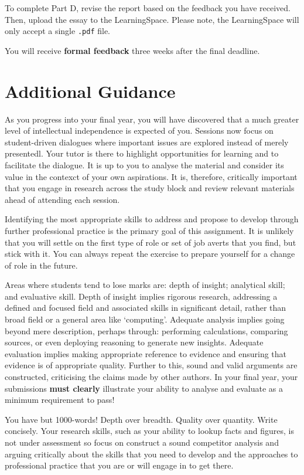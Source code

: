 \documentclass{../../fal_assignment}
\begin{document}
To complete Part D, revise the report based on the feedback you have received. Then, upload the essay to the LearningSpace. Please note, the LearningSpace will only accept a single \texttt{.pdf} file.

You will receive \textbf{formal feedback} three weeks after the final deadline.

\section*{Additional Guidance}

As you progress into your final year, you will have discovered that a much greater level of intellectual independence is expected of you. Sessions now focus on student-driven dialogues where important issues are explored instead of merely presentedl. Your tutor is there to highlight opportunities for learning and to facilitate the dialogue. It is up to you to analyse the material and consider its value in the contexct of your own aspirations. It is, therefore, critically important that you engage in research across the study block and review relevant materials ahead of attending each session.

Identifying the most appropriate skills to address and propose to develop through further professional practice is the primary goal of this assignment. It is unlikely that you will settle on the first type of role or set of job averts that you find, but stick with it. You can always repeat the exercise to prepare yourself for a change of role in the future. 

Areas where students tend to lose marks are: depth of insight; analytical skill; and evaluative skill. Depth of insight implies rigorous research, addressing a defined and focused field and associated skills in significant detail, rather than broad field or a general area like `computing'. Adequate analysis implies going beyond mere description, perhaps through: performing calculations, comparing sources, or even deploying reasoning to generate new insights. Adequate evaluation implies making appropriate reference to evidence and ensuring that evidence is of appropriate quality. Further to this, sound and valid arguments are constructed, criticising the claims made by other authors. In your final year, your submissions \textbf{must clearly} illustrate your ability to analyse and evaluate as a minimum requirement to pass!

You have but 1000-words! Depth over breadth. Quality over quantity. Write concisely. Your research skills, such as your ability to lookup facts and figures, is not under assessment so focus on construct a sound competitor analysis and arguing critically about the skills that you need to develop and the approaches to professional practice that you are or will engage in to get there.
\end{document}
